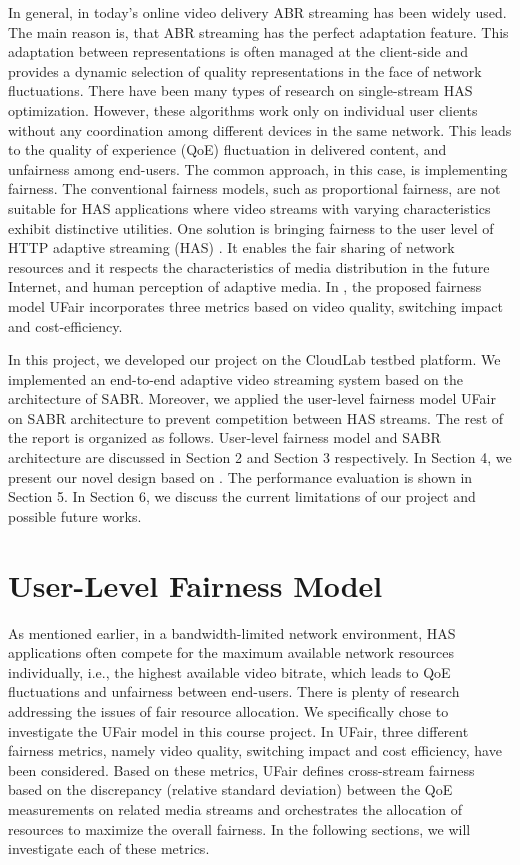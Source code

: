 \documentclass[12pt]{article}
\begin{document}
In general, in today's online video delivery ABR streaming has been widely used. The main reason is, that ABR streaming has the perfect adaptation feature. This adaptation between representations is often managed at the client-side and provides a dynamic selection of quality representations in the face of network fluctuations. There have been many types of research on single-stream HAS optimization. However, these algorithms work only on individual user clients without any coordination among different devices in the same network. This leads to the quality of experience (QoE) fluctuation in delivered content, and unfairness among end-users. The common approach, in this case, is implementing fairness. The conventional fairness models, such as proportional fairness, are not suitable for HAS applications where video streams with varying characteristics exhibit distinctive utilities. One solution is bringing fairness to the user level of HTTP adaptive streaming (HAS) \cite{mu_scalable_2016}. It enables the fair sharing of network resources and it respects the characteristics of media distribution in the future Internet, and human perception of adaptive media. In \cite{mu_scalable_2016}, the proposed fairness model UFair incorporates three metrics based on video quality, switching impact and cost-efficiency.

In this project, we developed our project on the CloudLab testbed platform. We implemented an end-to-end adaptive video streaming system based on the architecture of SABR. Moreover, we applied the user-level fairness model UFair on SABR architecture to prevent competition between HAS streams. The rest of the report is organized as follows. User-level fairness model and SABR architecture are discussed in Section 2 and Section 3 respectively. In Section 4, we present our novel design based on \cite{mu_scalable_2016}\cite{bhat_network_2017}. The performance evaluation is shown in Section 5. In Section 6, we discuss the current limitations of our project and possible future works.


\newpage
\section{User-Level Fairness Model}
As mentioned earlier, in a bandwidth-limited network environment, HAS applications often compete for the maximum available network resources individually, i.e., the highest available video bitrate, which leads to QoE fluctuations and unfairness between end-users. There is plenty of research addressing the issues of fair resource allocation. We specifically chose to investigate the UFair model \cite{mu_scalable_2016} in this course project. In UFair, three different fairness metrics, namely video quality, switching impact and cost efficiency, have been considered. Based on these metrics, UFair defines cross-stream fairness based on the discrepancy (relative standard deviation) between the QoE measurements on related media streams and orchestrates the allocation of resources to maximize the overall fairness. In the following sections, we will investigate each of these metrics.
\end{document}
